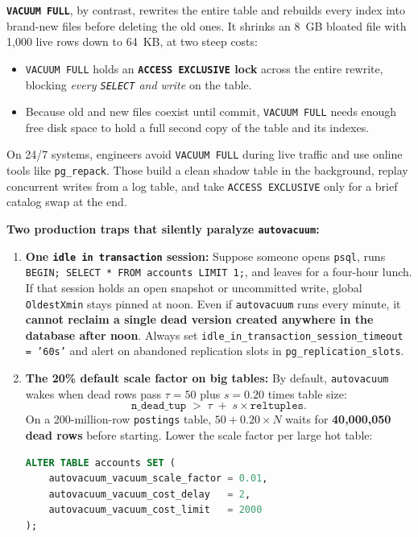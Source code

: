 \textbf{\texttt{VACUUM FULL}}, by contrast, rewrites the entire table and rebuilds every index into brand-new files before deleting the old ones. It shrinks an 8~GB bloated file with 1,000 live rows down to 64~KB, at two steep costs:
\begin{itemize}
  \item \texttt{VACUUM FULL} holds an \textbf{\texttt{ACCESS EXCLUSIVE} lock} across the entire rewrite, blocking \emph{every \texttt{SELECT} and write} on the table.
  \item Because old and new files coexist until commit, \texttt{VACUUM FULL} needs enough free disk space to hold a full second copy of the table and its indexes.
\end{itemize}
On 24/7 systems, engineers avoid \texttt{VACUUM FULL} during live traffic and use online tools like \texttt{pg\_repack}. Those build a clean shadow table in the background, replay concurrent writes from a log table, and take \texttt{ACCESS EXCLUSIVE} only for a brief catalog swap at the end.

\begin{trapbox}
\textbf{Two production traps that silently paralyze \texttt{autovacuum}:}
\begin{enumerate}
  \item \textbf{One \texttt{idle in transaction} session:} Suppose someone opens \texttt{psql}, runs \texttt{BEGIN; SELECT * FROM accounts LIMIT 1;}, and leaves for a four-hour lunch. If that session holds an open snapshot or uncommitted write, global \texttt{OldestXmin} stays pinned at noon. Even if \texttt{autovacuum} runs every minute, it \textbf{cannot reclaim a single dead version created anywhere in the database after noon}. Always set \texttt{idle\_in\_transaction\_session\_timeout = '60s'} and alert on abandoned replication slots in \texttt{pg\_replication\_slots}.
  \item \textbf{The 20\% default scale factor on big tables:} By default, \texttt{autovacuum} wakes when dead rows pass $\tau = 50$ plus $s = 0.20$ times table size:
  \[
    \texttt{n\_dead\_tup} \;>\; \tau \;+\; s \times \texttt{reltuples}.
  \]
  On a 200-million-row \texttt{postings} table, $50 + 0.20 \times N$ waits for \textbf{40,000,050 dead rows} before starting. Lower the scale factor per large hot table:
\begin{lstlisting}[language=SQL]
ALTER TABLE accounts SET (
    autovacuum_vacuum_scale_factor = 0.01,
    autovacuum_vacuum_cost_delay   = 2,
    autovacuum_vacuum_cost_limit   = 2000
);
\end{lstlisting}
\end{enumerate}
\end{trapbox}

